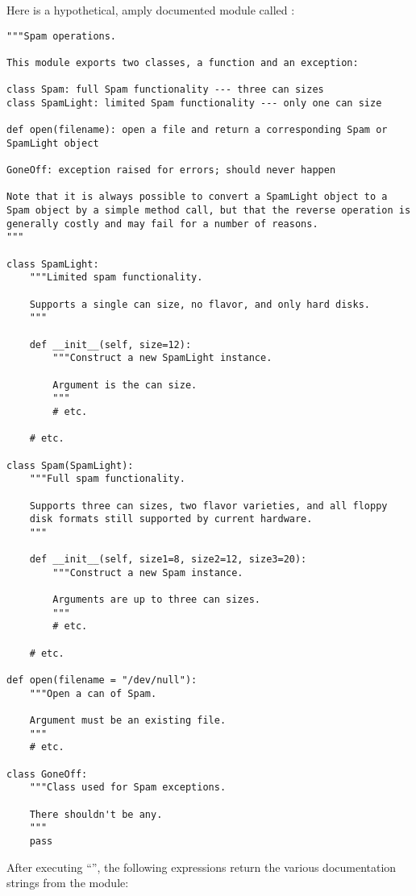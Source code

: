 Here is a hypothetical, amply documented module called :

\begin{verbatim}
"""Spam operations.

This module exports two classes, a function and an exception:

class Spam: full Spam functionality --- three can sizes
class SpamLight: limited Spam functionality --- only one can size

def open(filename): open a file and return a corresponding Spam or
SpamLight object

GoneOff: exception raised for errors; should never happen

Note that it is always possible to convert a SpamLight object to a
Spam object by a simple method call, but that the reverse operation is
generally costly and may fail for a number of reasons.
"""

class SpamLight:
    """Limited spam functionality.

    Supports a single can size, no flavor, and only hard disks.
    """

    def __init__(self, size=12):
        """Construct a new SpamLight instance.

        Argument is the can size.
        """
        # etc.

    # etc.

class Spam(SpamLight):
    """Full spam functionality.

    Supports three can sizes, two flavor varieties, and all floppy
    disk formats still supported by current hardware.
    """

    def __init__(self, size1=8, size2=12, size3=20):
        """Construct a new Spam instance.

        Arguments are up to three can sizes.
        """
        # etc.

    # etc.

def open(filename = "/dev/null"):
    """Open a can of Spam.

    Argument must be an existing file.
    """
    # etc.

class GoneOff:
    """Class used for Spam exceptions.

    There shouldn't be any.
    """
    pass
\end{verbatim}

After executing ``'', the following expressions
return the various documentation strings from the module:

